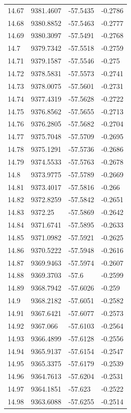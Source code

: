 \begin{table}[H]
\begin{tabular}{llll}
14.67 & 9381.4607 & -57.5435 & -0.2786 \\
14.68 & 9380.8852 & -57.5463 & -0.2777 \\
14.69 & 9380.3097 & -57.5491 & -0.2768 \\
14.7 & 9379.7342 & -57.5518 & -0.2759 \\
14.71 & 9379.1587 & -57.5546 & -0.275 \\
14.72 & 9378.5831 & -57.5573 & -0.2741 \\
14.73 & 9378.0075 & -57.5601 & -0.2731 \\
14.74 & 9377.4319 & -57.5628 & -0.2722 \\
14.75 & 9376.8562 & -57.5655 & -0.2713 \\
14.76 & 9376.2805 & -57.5682 & -0.2704 \\
14.77 & 9375.7048 & -57.5709 & -0.2695 \\
14.78 & 9375.1291 & -57.5736 & -0.2686 \\
14.79 & 9374.5533 & -57.5763 & -0.2678 \\
14.8 & 9373.9775 & -57.5789 & -0.2669 \\
14.81 & 9373.4017 & -57.5816 & -0.266 \\
14.82 & 9372.8259 & -57.5842 & -0.2651 \\
14.83 & 9372.25 & -57.5869 & -0.2642 \\
14.84 & 9371.6741 & -57.5895 & -0.2633 \\
14.85 & 9371.0982 & -57.5921 & -0.2625 \\
14.86 & 9370.5222 & -57.5948 & -0.2616 \\
14.87 & 9369.9463 & -57.5974 & -0.2607 \\
14.88 & 9369.3703 & -57.6 & -0.2599 \\
14.89 & 9368.7942 & -57.6026 & -0.259 \\
14.9 & 9368.2182 & -57.6051 & -0.2582 \\
14.91 & 9367.6421 & -57.6077 & -0.2573 \\
14.92 & 9367.066 & -57.6103 & -0.2564 \\
14.93 & 9366.4899 & -57.6128 & -0.2556 \\
14.94 & 9365.9137 & -57.6154 & -0.2547 \\
14.95 & 9365.3375 & -57.6179 & -0.2539 \\
14.96 & 9364.7613 & -57.6204 & -0.2531 \\
14.97 & 9364.1851 & -57.623 & -0.2522 \\
14.98 & 9363.6088 & -57.6255 & -0.2514 \\

\end{tabular}
\end{table}
